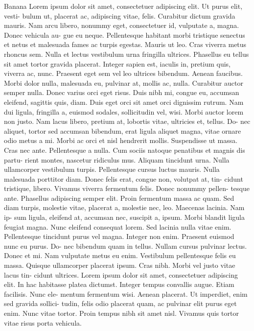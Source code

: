 \documentclass[draft,12pt,twoside,a4paper]{book}
\begin{document}
\setlength{\textheight}{200pt}
Banana
\clearpage
Lorem ipsum dolor sit amet, consectetuer adipiscing elit. Ut purus elit, vesti- bulum ut, placerat ac, adipiscing vitae, felis. Curabitur dictum gravida mauris. Nam arcu libero, nonummy eget, consectetuer id, vulputate a, magna. Donec vehicula au- gue eu neque. Pellentesque habitant morbi tristique senectus et netus et malesuada fames ac turpis egestas. Mauris ut leo. Cras viverra metus rhoncus sem. Nulla et lectus vestibulum urna fringilla ultrices. Phasellus eu tellus sit amet tortor gravida placerat. Integer sapien est, iaculis in, pretium quis, viverra ac, nunc. Praesent eget sem vel leo ultrices bibendum. Aenean faucibus. Morbi dolor nulla, malesuada eu, pulvinar at, mollis ac, nulla. Curabitur auctor semper nulla. Donec varius orci eget risus. Duis nibh mi, congue eu, accumsan eleifend, sagittis quis, diam. Duis eget orci sit amet orci dignissim rutrum.
Nam dui ligula, fringilla a, euismod sodales, sollicitudin vel, wisi. Morbi auctor lorem non justo. Nam lacus libero, pretium at, lobortis vitae, ultricies et, tellus. Do- nec aliquet, tortor sed accumsan bibendum, erat ligula aliquet magna, vitae ornare odio metus a mi. Morbi ac orci et nisl hendrerit mollis. Suspendisse ut massa. Cras nec ante. Pellentesque a nulla. Cum sociis natoque penatibus et magnis dis partu- rient montes, nascetur ridiculus mus. Aliquam tincidunt urna. Nulla ullamcorper vestibulum turpis. Pellentesque cursus luctus mauris.
Nulla malesuada porttitor diam. Donec felis erat, congue non, volutpat at, tin- cidunt tristique, libero. Vivamus viverra fermentum felis. Donec nonummy pellen- tesque ante. Phasellus adipiscing semper elit. Proin fermentum massa ac quam. Sed diam turpis, molestie vitae, placerat a, molestie nec, leo. Maecenas lacinia. Nam ip- sum ligula, eleifend at, accumsan nec, suscipit a, ipsum. Morbi blandit ligula feugiat magna. Nunc eleifend consequat lorem. Sed lacinia nulla vitae enim. Pellentesque tincidunt purus vel magna. Integer non enim. Praesent euismod nunc eu purus. Do- nec bibendum quam in tellus. Nullam cursus pulvinar lectus. Donec et mi. Nam vulputate metus eu enim. Vestibulum pellentesque felis eu massa.
Quisque ullamcorper placerat ipsum. Cras nibh. Morbi vel justo vitae lacus tin- cidunt ultrices. Lorem ipsum dolor sit amet, consectetuer adipiscing elit. In hac habitasse platea dictumst. Integer tempus convallis augue. Etiam facilisis. Nunc ele- mentum fermentum wisi. Aenean placerat. Ut imperdiet, enim sed gravida sollici- tudin, felis odio placerat quam, ac pulvinar elit purus eget enim. Nunc vitae tortor. Proin tempus nibh sit amet nisl. Vivamus quis tortor vitae risus porta vehicula.
\end{document}
